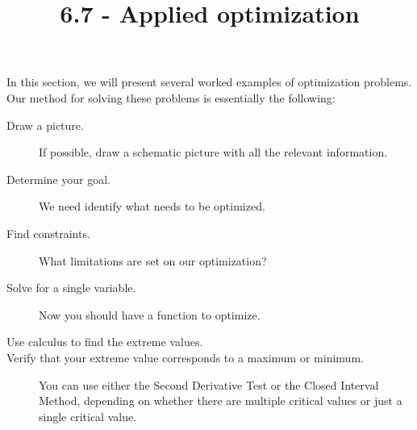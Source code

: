 \documentclass{ximera}
\title{6.7 - Applied optimization}
\begin{document}
\begin{abstract}
\end{abstract}
\maketitle

In this section, we will present several worked examples of
optimization problems. Our method for solving these problems is
essentially the following:
\begin{description}
\item[Draw a picture.] If possible, draw a schematic picture with all the relevant information. 
\item[Determine your goal.] We need identify what needs to be
  optimized.
\item[Find constraints.] What limitations are set on our
  optimization?
\item[Solve for a single variable.] Now you should have a function to optimize.
\item[Use calculus to find the extreme values.] 
\item[Verify that your extreme value corresponds to a maximum or minimum.] You can use either the Second Derivative Test or the Closed Interval Method, depending on whether there are multiple critical values or just a single critical value.
\end{description}
\end{document}

